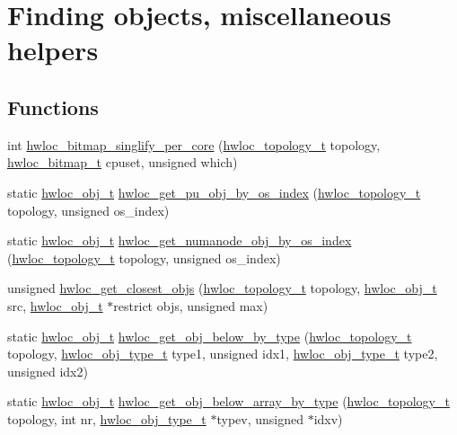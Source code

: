 \hypertarget{a00200}{}\section{Finding objects, miscellaneous helpers}
\label{a00200}
\subsection*{Functions}
\begin{DoxyCompactItemize}
\item 
int \hyperlink{a00200_ga050646458efc8ca1120d9f124c5ad861}{hwloc\+\_\+bitmap\+\_\+singlify\+\_\+per\+\_\+core} (\hyperlink{a00186_ga9d1e76ee15a7dee158b786c30b6a6e38}{hwloc\+\_\+topology\+\_\+t} topology, \hyperlink{a00205_gaa3c2bf4c776d603dcebbb61b0c923d84}{hwloc\+\_\+bitmap\+\_\+t} cpuset, unsigned which)
\item 
static \hyperlink{a00185_ga79b8ab56877ef99ac59b833203391c7d}{hwloc\+\_\+obj\+\_\+t} \hyperlink{a00200_ga751c238a4931db5cc0ca3181b7dd7479}{hwloc\+\_\+get\+\_\+pu\+\_\+obj\+\_\+by\+\_\+os\+\_\+index} (\hyperlink{a00186_ga9d1e76ee15a7dee158b786c30b6a6e38}{hwloc\+\_\+topology\+\_\+t} topology, unsigned os\+\_\+index)
\item 
static \hyperlink{a00185_ga79b8ab56877ef99ac59b833203391c7d}{hwloc\+\_\+obj\+\_\+t} \hyperlink{a00200_gab89d9ed9edfaa3dd526fb6ee1a1618ea}{hwloc\+\_\+get\+\_\+numanode\+\_\+obj\+\_\+by\+\_\+os\+\_\+index} (\hyperlink{a00186_ga9d1e76ee15a7dee158b786c30b6a6e38}{hwloc\+\_\+topology\+\_\+t} topology, unsigned os\+\_\+index)
\item 
unsigned \hyperlink{a00200_ga2cd22a34360643f7f5bad09576dec205}{hwloc\+\_\+get\+\_\+closest\+\_\+objs} (\hyperlink{a00186_ga9d1e76ee15a7dee158b786c30b6a6e38}{hwloc\+\_\+topology\+\_\+t} topology, \hyperlink{a00185_ga79b8ab56877ef99ac59b833203391c7d}{hwloc\+\_\+obj\+\_\+t} src, \hyperlink{a00185_ga79b8ab56877ef99ac59b833203391c7d}{hwloc\+\_\+obj\+\_\+t} $\ast$restrict objs, unsigned max)
\item 
static \hyperlink{a00185_ga79b8ab56877ef99ac59b833203391c7d}{hwloc\+\_\+obj\+\_\+t} \hyperlink{a00200_ga7a0c1046851f7a88bd52f5a1d4ba0a97}{hwloc\+\_\+get\+\_\+obj\+\_\+below\+\_\+by\+\_\+type} (\hyperlink{a00186_ga9d1e76ee15a7dee158b786c30b6a6e38}{hwloc\+\_\+topology\+\_\+t} topology, \hyperlink{a00184_gacd37bb612667dc437d66bfb175a8dc55}{hwloc\+\_\+obj\+\_\+type\+\_\+t} type1, unsigned idx1, \hyperlink{a00184_gacd37bb612667dc437d66bfb175a8dc55}{hwloc\+\_\+obj\+\_\+type\+\_\+t} type2, unsigned idx2)
\item 
static \hyperlink{a00185_ga79b8ab56877ef99ac59b833203391c7d}{hwloc\+\_\+obj\+\_\+t} \hyperlink{a00200_gacb51295ff3fbd3a96f990f20c6492b1d}{hwloc\+\_\+get\+\_\+obj\+\_\+below\+\_\+array\+\_\+by\+\_\+type} (\hyperlink{a00186_ga9d1e76ee15a7dee158b786c30b6a6e38}{hwloc\+\_\+topology\+\_\+t} topology, int nr, \hyperlink{a00184_gacd37bb612667dc437d66bfb175a8dc55}{hwloc\+\_\+obj\+\_\+type\+\_\+t} $\ast$typev, unsigned $\ast$idxv)
\end{DoxyCompactItemize}


